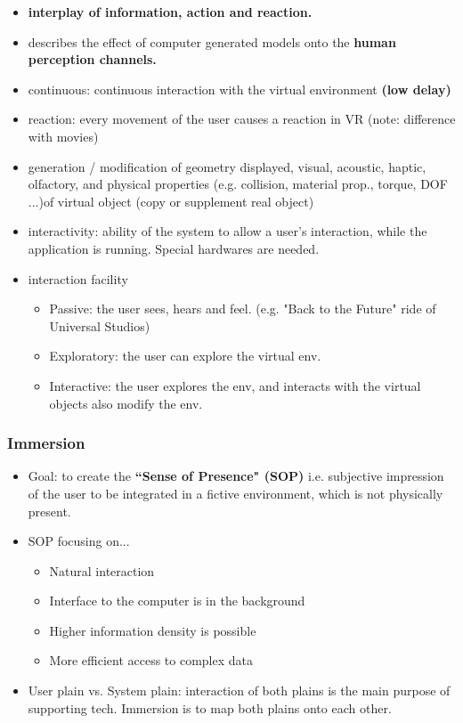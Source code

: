 \documentclass{standalone}
\begin{document}
\begin{itemize}
	\item \textbf{interplay of information, action and reaction.}
	\item describes the effect of computer generated models onto the \textbf{human perception channels.} 
	\item continuous: continuous interaction with the virtual environment \textbf{(low delay)}
	\item reaction: every movement of the user causes a reaction in VR (note: difference with movies)
	\item generation / modification of geometry displayed, visual, acoustic, haptic, olfactory, and physical properties (e.g. collision, material prop., torque, DOF ...)of virtual object (copy or supplement real object)
	\item interactivity: ability of the system to allow a user's interaction, while the application is running. Special hardwares are needed.
	\item interaction facility 
		\begin{itemize}
			\item Passive: the user sees, hears and feel. (e.g. "Back to the Future" ride of Universal Studios)
			\item Exploratory: the user can explore the virtual env. 
			\item Interactive: the user explores the env, and interacts with the virtual objects also modify the env.
		\end{itemize}
\end{itemize}

\subsubsection*{Immersion}

\begin{itemize}
	\item Goal: to create the \textbf{``Sense of Presence" (SOP)} i.e. subjective impression of the user to be integrated in a fictive environment, which is not physically present.
	\item SOP focusing on...
		\begin{itemize}
			\item Natural interaction
			\item Interface to the computer is in the background
			\item Higher information density is possible
			\item More efficient access to complex data
		\end{itemize}
	\item User plain vs. System plain: interaction of both plains is the main purpose of supporting tech. Immersion is to map both plains onto each other.
\end{itemize}
\end{document}
